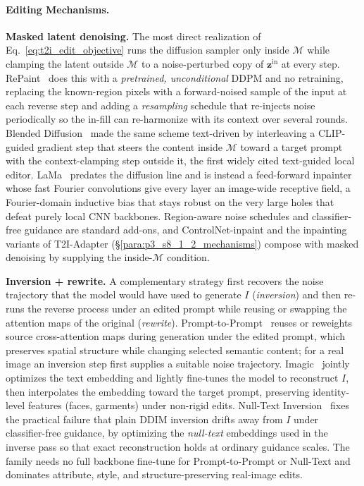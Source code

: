 \paragraph{Editing Mechanisms.}
\label{para:p3_s8_1_3_mechanisms}

\textbf{Masked latent denoising.}
The most direct realization of Eq.~\eqref{eq:t2i_edit_objective} runs the diffusion sampler only inside $\mathcal{M}$ while clamping the latent outside $\mathcal{M}$ to a noise-perturbed copy of $\mathbf{z}^{\text{in}}$ at every step.
RePaint~\cite{lugmayr2022repaint} does this with a \emph{pretrained, unconditional} DDPM and no retraining, replacing the known-region pixels with a forward-noised sample of the input at each reverse step and adding a \emph{resampling} schedule that re-injects noise periodically so the in-fill can re-harmonize with its context over several rounds.
Blended Diffusion~\cite{avrahami2022blended} made the same scheme text-driven by interleaving a CLIP-guided gradient step that steers the content inside $\mathcal{M}$ toward a target prompt with the context-clamping step outside it, the first widely cited text-guided local editor.
LaMa~\cite{suvorov2022lama} predates the diffusion line and is instead a feed-forward inpainter whose fast Fourier convolutions give every layer an image-wide receptive field, a Fourier-domain inductive bias that stays robust on the very large holes that defeat purely local CNN backbones.
Region-aware noise schedules and classifier-free guidance are standard add-ons, and ControlNet-inpaint and the inpainting variants of T2I-Adapter (§\ref{para:p3_s8_1_2_mechanisms}) compose with masked denoising by supplying the inside-$\mathcal{M}$ condition.

\textbf{Inversion + rewrite.}
A complementary strategy first recovers the noise trajectory that the model would have used to generate $I$ (\emph{inversion}) and then re-runs the reverse process under an edited prompt while reusing or swapping the attention maps of the original (\emph{rewrite}).
Prompt-to-Prompt~\cite{prompt-to-prompt} reuses or reweights source cross-attention maps during generation under the edited prompt, which preserves spatial structure while changing selected semantic content; for a real image an inversion step first supplies a suitable noise trajectory.
Imagic~\cite{kawar2023imagic} jointly optimizes the text embedding and lightly fine-tunes the model to reconstruct $I$, then interpolates the embedding toward the target prompt, preserving identity-level features (faces, garments) under non-rigid edits.
Null-Text Inversion~\cite{mokady2023nulltext} fixes the practical failure that plain DDIM inversion drifts away from $I$ under classifier-free guidance, by optimizing the \emph{null-text} embeddings used in the inverse pass so that exact reconstruction holds at ordinary guidance scales.
The family needs no full backbone fine-tune for Prompt-to-Prompt or Null-Text and dominates attribute, style, and structure-preserving real-image edits.

